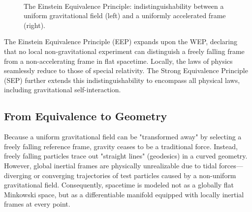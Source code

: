 \documentclass[11pt, a4paper]{report}
\begin{document}
\begin{figure}[htbp]
\centering
{}
\caption{The Einstein Equivalence Principle: indistinguishability between a uniform gravitational field (left) and a uniformly accelerated frame (right).}\
\label{fig:equivalence_principle}
\end{figure}


The Einstein Equivalence Principle (EEP) expands upon the WEP, declaring that no local non-gravitational experiment can distinguish a freely falling frame from a non-accelerating frame in flat spacetime. Locally, the laws of physics seamlessly reduce to those of special relativity. The Strong Equivalence Principle (SEP) further extends this indistinguishability to encompass all physical laws, including gravitational self-interaction.

\subsection*{From Equivalence to Geometry}
Because a uniform gravitational field can be "transformed away" by selecting a freely falling reference frame, gravity ceases to be a traditional force. Instead, freely falling particles trace out "straight lines" (geodesics) in a curved geometry. However, global inertial frames are physically unrealizable due to tidal forces—diverging or converging trajectories of test particles caused by a non-uniform gravitational field. Consequently, spacetime is modeled not as a globally flat Minkowski space, but as a differentiable manifold equipped with locally inertial frames at every point.
\end{document}
